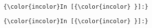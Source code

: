 \documentclass{article}
\begin{document}
    \begin{center}
    \end{center}
    { \hspace*{\fill} \\}
    
    \begin{Verbatim}[commandchars=\\\{\}]
{\color{incolor}In [{\color{incolor} }]:} 
\end{Verbatim}

    \begin{Verbatim}[commandchars=\\\{\}]
{\color{incolor}In [{\color{incolor} }]:} 
\end{Verbatim}


    
    
    
    
\end{document}
